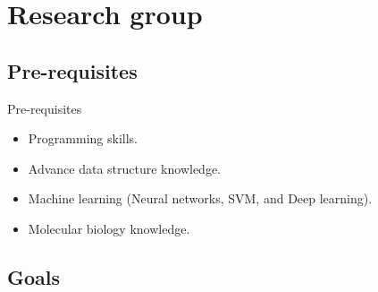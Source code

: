 \documentclass[10pt]{beamer}
\newcommand{\1}{
        	\setbeamertemplate{background}{
        		\texttt{[image: img/1]}
        		\tikz[overlay] \fill[fill opacity=0.75,fill=white] (0,0) rectangle (-\paperwidth,\paperheight);
        	}
}
\begin{document}
\section{Research group}

\subsection{Pre-requisites}

\begin{frame}{Pre-requisites}{}
	\begin{block}{}
		\begin{itemize}
			\item Programming skills. \pause
			\item Advance data structure knowledge. \pause
			\item Machine learning (Neural networks, SVM, and Deep learning). \pause
			\item Molecular biology knowledge. 
		\end{itemize}
	\end{block}
\end{frame}

\subsection{Goals}
\end{document}

